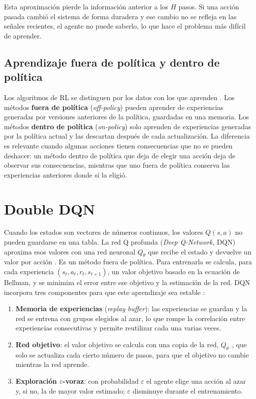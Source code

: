Esta aproximación pierde la información anterior a los $H$ pasos. Si una acción pasada
cambió el sistema de forma duradera y ese cambio no se refleja en las señales recientes, el
agente no puede saberlo, lo que hace el problema más difícil de aprender.

\subsection{Aprendizaje fuera de política y dentro de política}
\label{sec:onoff}

Los algoritmos de RL se distinguen por los datos con los que aprenden \cite{sutton2018rl}.
Los métodos \textbf{fuera de política} (\textit{off-policy}) pueden aprender de
experiencias generadas por versiones anteriores de la política, guardadas en una memoria.
Los métodos \textbf{dentro de política} (\textit{on-policy}) solo aprenden de experiencias
generadas por la política actual y las descartan después de cada actualización. La
diferencia es relevante cuando algunas acciones tienen consecuencias que no se pueden
deshacer: un método dentro de política que deja de elegir una acción deja de observar sus
consecuencias, mientras que uno fuera de política conserva las experiencias anteriores
donde sí la eligió.

\section{Double DQN}
\label{sec:dqn}

Cuando los estados son vectores de números continuos, los valores $Q(s,a)$ no pueden
guardarse en una tabla. La red Q profunda (\textit{Deep Q-Network}, DQN) aproxima esos
valores con una red neuronal $Q_\theta$ que recibe el estado y devuelve un valor por acción
\cite{mnih2015dqn}. Es un método fuera de política. Para entrenarla se calcula, para cada
experiencia $(s_t, a_t, r_t, s_{t+1})$, un valor objetivo basado en la ecuación de Bellman, y
se minimiza el error entre ese objetivo y la estimación de la red. DQN incorpora tres
componentes para que este aprendizaje sea estable \cite{mnih2015dqn}:

\begin{enumerate}
    \item \textbf{Memoria de experiencias} (\textit{replay buffer}): las experiencias se
    guardan y la red se entrena con grupos elegidos al azar, lo que rompe la correlación
    entre experiencias consecutivas y permite reutilizar cada una varias veces.
    \item \textbf{Red objetivo}: el valor objetivo se calcula con una copia de la red,
    $Q_{\theta^-}$, que solo se actualiza cada cierto número de pasos, para que el objetivo
    no cambie mientras la red aprende.
    \item \textbf{Exploración $\varepsilon$-voraz}: con probabilidad $\varepsilon$ el agente
    elige una acción al azar y, si no, la de mayor valor estimado; $\varepsilon$ disminuye
    durante el entrenamiento.
\end{enumerate}

